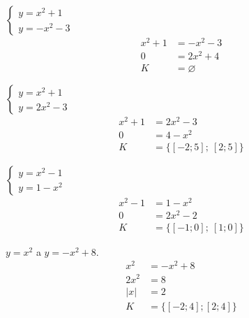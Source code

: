 \documentclass[11pt,a4paper]{article}
\begin{document}
\begin{prikladReseniBox}[title={Příklad 3}]
$\begin{cases}y=x^{2} + 1\\y=- x^{2} - 3\end{cases}$
\tcblower
\[
\begin{aligned}
x^{2} + 1&=- x^{2} - 3\\[2pt]
0&=2x^{2} + 4\\[2pt]
K&=\varnothing
\end{aligned}
\]
\end{prikladReseniBox}
\begin{zadaniReseniBox}[title={Samostatná práce 1}]
$\begin{cases}y=x^{2} + 1\\y=2x^{2} - 3\end{cases}$
\tcblower
\[
\begin{aligned}
x^{2} + 1&=2x^{2} - 3\\[2pt]
0&=4 - x^{2}\\[2pt]
K&=\{[-2;5];\ [2;5]\}
\end{aligned}
\]
\end{zadaniReseniBox}
\begin{zadaniReseniBox}[title={Samostatná práce 2}]
$\begin{cases}y=x^{2} - 1\\y=1 - x^{2}\end{cases}$
\tcblower
\[
\begin{aligned}
x^{2} - 1&=1 - x^{2}\\[2pt]
0&=2x^{2} - 2\\[2pt]
K&=\{[-1;0];\ [1;0]\}
\end{aligned}
\]
\end{zadaniReseniBox}
\begin{zadaniReseniBox}[title={Rozšíření 1}]
$y=x^2$ a $y=-x^2+8$.
\tcblower
\[\begin{aligned}
x^2&=-x^2+8\\2x^2&=8\\|x|&=2\\K&=\{[-2;4];[2;4]\}
\end{aligned}\]
\end{zadaniReseniBox}
\end{document}
